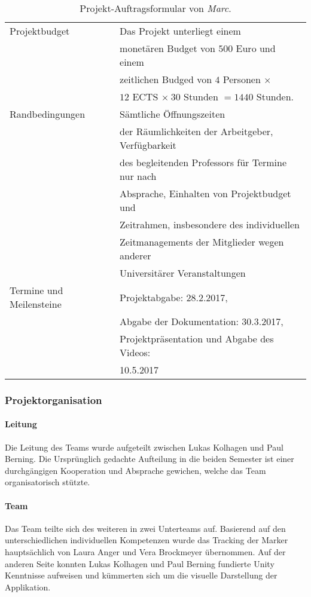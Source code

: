 \begin{table}
\begin{tabularx}{\textwidth}{|l|l|}
\hline
	Projektbudget & Das Projekt unterliegt einem\\
	& monetären Budget von $500$ Euro und einem\\
	& zeitlichen Budged von $4$ Personen $\times$ \\
	&$12$ ECTS $\times \ 30$ Stunden $ = 1440$ Stunden.\\
	\hline
	Randbedingungen & Sämtliche Öffnungszeiten\\
	& der Räumlichkeiten der Arbeitgeber, Verfügbarkeit\\
	& des begleitenden Professors für Termine nur nach \\
	&Absprache, Einhalten von Projektbudget und \\
	&Zeitrahmen, insbesondere des individuellen \\
	&Zeitmanagements der Mitglieder wegen anderer\\
	& Universitärer Veranstaltungen\\
	\hline
	Termine und Meilensteine & Projektabgabe: 28.2.2017, \\
	&Abgabe der Dokumentation: 30.3.2017, \\
	&Projektpräsentation und Abgabe des Videos: \\
	&10.5.2017\\
	\hline

	\end{tabularx}
	\caption[Projekt-Auftragsformular von \emph{Marc}]{Projekt-Auftragsformular von \emph{Marc}.}
	\label{tab:Projektformular}
\end{table}

\subsubsection{Projektorganisation}
\paragraph{Leitung} Die Leitung des Teams wurde aufgeteilt zwischen Lukas Kolhagen und Paul Berning. Die Ursprünglich gedachte Aufteilung in die beiden Semester ist einer durchgängigen Kooperation und Absprache gewichen, welche das Team organisatorisch stützte.
\paragraph{Team} Das Team teilte sich des weiteren in zwei Unterteams auf. Basierend auf den unterschiedlichen individuellen Kompetenzen wurde das Tracking der Marker hauptsächlich von Laura Anger und Vera Brockmeyer übernommen. Auf der anderen Seite konnten Lukas Kolhagen und Paul Berning fundierte Unity Kenntnisse aufweisen und kümmerten sich um die visuelle Darstellung der Applikation.

